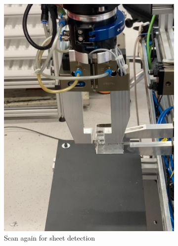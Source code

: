 \begin{figure}[h]
\begin{subfigure}[b]{0.32\textwidth}
        \includegraphics[width=\textwidth]{figures/sheet-pickup/sheet-placement04.png}
        \caption{Scan again for sheet detection}
        \label{subfig:sheet-placement04}
    \end{subfigure}\hspace{0.1cm}
    \vspace{0.75cm}
    \begin{subfigure}[b]{0.32\textwidth}
        \centering

\end{subfigure}
\end{figure}
